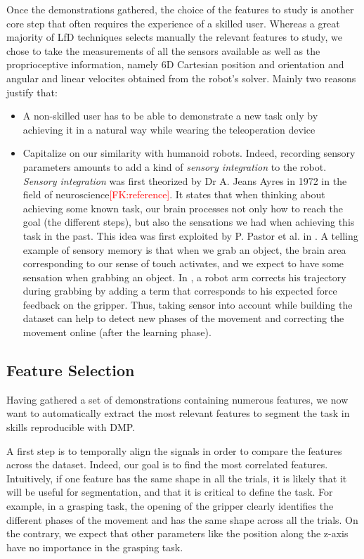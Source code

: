 \documentclass[conference]{IEEEtran}
\newcommand{\fk}[1]{\textcolor{red}{[FK:#1]}}
\begin{document}
Once the demonstrations gathered, the choice of the features to study is another core step that often requires the experience of a skilled user. Whereas a great majority of LfD techniques selects manually the relevant features to study, we chose to take the measurements of all the sensors available as well as the proprioceptive information, namely 6D Cartesian position and orientation and angular and linear velocites obtained from the robot's solver. Mainly two reasons justify that:

 \begin{itemize}
     \item A non-skilled user has to be able to demonstrate a new task only by achieving it in a  natural way while wearing the teleoperation device
     \item Capitalize on our similarity with humanoid robots. Indeed, recording sensory parameters amounts to add a kind of \textit{sensory integration} to the robot. \textit{Sensory integration} was first theorized by Dr A. Jeans Ayres in 1972 in the field of neuroscience\fk{reference}. It states that when thinking about achieving some known task, our brain processes not only how to reach the goal (the different steps), but also the sensations we had when achieving this task in the past. This idea was first exploited by P. Pastor et al. in \cite{sensory_skill}. A telling example of sensory memory is that when we grab an object, the brain area corresponding to our sense of touch activates, and we expect to have some sensation when grabbing an object. In \cite{sensory_skill}, a robot arm corrects his trajectory during grabbing by adding a term that corresponds to his expected force feedback on the gripper. Thus, taking sensor into account while building the dataset can help to detect new phases of the movement \cite{sensory_seg} and correcting the movement online (after the learning phase). \newline

\end{itemize}


\subsection{Feature Selection} \label{feature_selection}

Having gathered a set of demonstrations containing numerous features, we now want to automatically extract the most relevant features to segment the task in skills reproducible with DMP.

A first step is to temporally align the signals in order to compare the features across the dataset. Indeed, our goal is to find the most correlated features. Intuitively, if one feature has the same shape in all the trials, it is likely that it will be useful for segmentation, and that it is critical to define the task. For example, in a grasping task, the opening of the gripper clearly identifies the different phases of the movement and has the same shape across all the trials. On the contrary, we expect that other parameters like the position along the z-axis have no importance in the grasping task.
\end{document}
